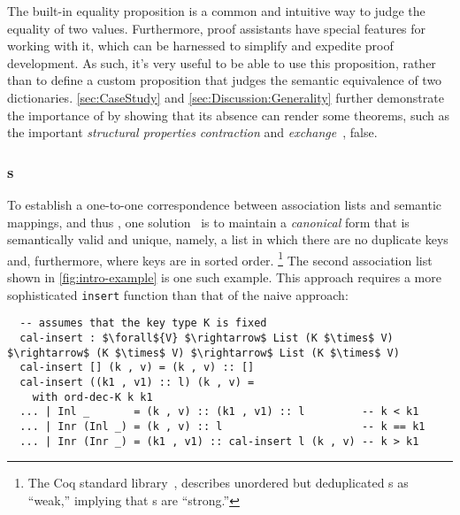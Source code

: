 The built-in equality proposition is a common and intuitive way to judge the equality of two values.
%
Furthermore, proof assistants have special features for working with it, which can be harnessed to simplify and expedite proof development.
%
As such, it's very useful to be able to use this proposition, rather than to define a custom proposition that judges the semantic equivalence of two dictionaries.
%
\autoref{sec:CaseStudy} and \autoref{sec:Discussion:Generality} further demonstrate the importance of \Extensional{} by showing that its absence can render some theorems, such as the important \emph{structural properties} \emph{contraction} and \emph{exchange}~\citep{StructProp}, false.


\subsubsection{\Cal{}s}

To establish a one-to-one correspondence between association lists and semantic mappings, and thus \Extensional, one solution~\citep{FMapList} is to maintain a \emph{canonical}
%
form that is semantically valid and unique, namely, a list in which there are no duplicate keys and, furthermore, where keys are in sorted order.%
%
\footnote{\hspace{0.01in}%
%
The Coq standard library~\citep{FMapInterface}, describes unordered but deduplicated \sal{}s as ``weak,'' implying that \cal{}s are ``strong.''
%
}
%
The second association list shown in \autoref{fig:intro-example} is one such example.
%
This approach requires a more sophisticated \texttt{insert} function than that of the naive \sal{} approach:
\begin{lstlisting}
  -- assumes that the key type K is fixed
  cal-insert : $\forall${V} $\rightarrow$ List (K $\times$ V) $\rightarrow$ (K $\times$ V) $\rightarrow$ List (K $\times$ V)
  cal-insert [] (k , v) = (k , v) :: []
  cal-insert ((k1 , v1) :: l) (k , v) =
    with ord-dec-K k k1
  ... | Inl _       = (k , v) :: (k1 , v1) :: l         -- k < k1
  ... | Inr (Inl _) = (k , v) :: l                      -- k == k1
  ... | Inr (Inr _) = (k1 , v1) :: cal-insert l (k , v) -- k > k1
\end{lstlisting}


